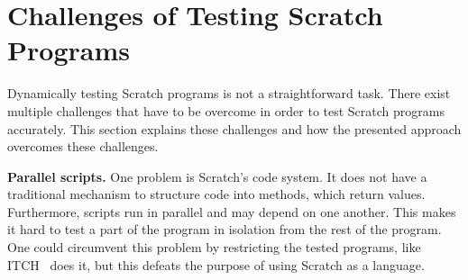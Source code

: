 %
%
%

\section{Challenges of Testing Scratch Programs}

Dynamically testing Scratch programs is not a straightforward task.
There exist multiple challenges that have to be overcome in order to test Scratch programs accurately.
This section explains these challenges and how the presented approach overcomes these challenges.

\textbf{Parallel scripts.}
One problem is Scratch's code system.
It does not have a traditional mechanism to structure code into methods, which return values.
Furthermore, scripts run in parallel and may depend on one another.
This makes it hard to test a part of the program in isolation from the rest of the program.
One could circumvent this problem by restricting the tested programs, like ITCH~\cite{itch} does it,
but this defeats the purpose of using Scratch as a language.

